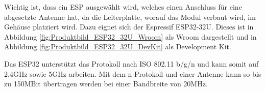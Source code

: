 Wichtig ist, dass ein ESP ausgewählt wird, welches einen Anschluss für eine abgesetzte Antenne hat, da die Leiterplatte, worauf das Modul verbaut wird, im Gehäuse platziert wird. Dazu eignet sich der Espressif ESP32-32U. Dieses ist in Abbildung \ref{fig:Produktbild_ESP32_32U_Wroom} als Wroom dargestellt und in Abbildung \ref{fig:Produktbild_ESP32_32U_DevKit} als Development Kit.

Das ESP32 unterstützt das Protokoll nach ISO 802.11 b/g/n und kann somit auf 2.4GHz sowie 5GHz arbeiten. Mit dem n-Protokoll und einer Antenne kann so bis zu 150MBit übertragen werden bei einer Bandbreite von 20MHz.

%
